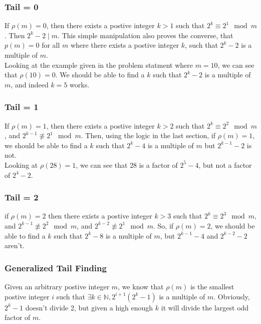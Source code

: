 \documentclass{article}
\begin{document}
  \subsubsection{Tail = 0}
  If $\rho (m) = 0$, then there exists a postive integer $k > 1$ such that $2^k \equiv 2^1 \mod m$. Then $2^k - 2 \mid m$. This simple manipulation also proves the converse, that $p(m) = 0$ for all $m$ where there exists a postive integer $k$, such that $2^k - 2$ is a multiple of $m$.\\

  Looking at the example given in the problem statment where $m=10$, we can see that $\rho(10) = 0$. We should be able to find a $k$ such that $2^k -2$ is a multiple of $m$, and indeed $k=5$ works.
  \subsubsection{Tail = 1}
  If $\rho (m) = 1$, then there exists a postive integer $k > 2$ such that $2^k \equiv 2^2 \mod m$, and $2^{k-1} \not\equiv 2^1 \mod m.$ Then, using the logic in the last section, if $\rho(m) = 1$, we should be able to find a $k$ such that $2^k - 4$ is a multiple of $m$ but $2^{k-1} - 2$ is not.\\

  Looking at $\rho(28) = 1$, we can see that $28$ is a factor of $2^5 - 4$, but not a factor of $2^4 - 2$. 
  \subsubsection{Tail = 2}
  if $\rho (m) = 2$ then there exists a postive integer $k > 3$ such that $2^k \equiv 2^3 \mod m$, and $2^{k-1} \not\equiv 2^2 \mod m$, and $2^{k-2} \not\equiv 2^1 \mod m$. So, if $\rho(m) = 2$, we should be able to find a $k$ such that $2^k - 8$ is a multiple of $m$, but $2^{k-1} - 4$ and $2^{k-2} - 2$ aren't.
  \subsubsection{Generalized Tail Finding}
  Given an arbitrary postive integer $m$, we know that $\rho(m)$ is the smallest postive integer $i$ such that $\exists k \in \mathbb{N}, 2^{i+1}(2^k - 1)$ is a multiple of $m$. Obviously, $2^k-1$ doesn't divide 2, but given a high enough $k$ it will divide the largest odd factor of $m$.\\
\end{document}
